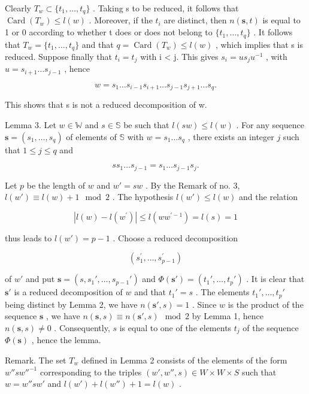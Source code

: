 Clearly \(T_{w} \subset \{t_{1}, \ldots, t_{q}\}\) . Taking s to be reduced, it follows that \(\operatorname{Card}(T_{w}) \leqslant l(w)\) . Moreover, if the \(t_{i}\) are distinct, then \(n(\mathbf{s}, t)\) is equal to 1 or 0 according to whether t does or does not belong to \(\{t_{1}, \ldots, t_{q}\}\) . It follows that \(T_{w} = \{t_{1}, \ldots, t_{q}\}\) and that \(q = \operatorname{Card}(T_{w}) \leqslant l(w)\) , which implies that s is reduced. Suppose finally that \(t_{i} = t_{j}\) with i \textless{} j. This gives \(s_{i} = us_{j}u^{-1}\) , with \(u = s_{i+1} \ldots s_{j-1}\) , hence

\[
w = s _ {1} \dots s _ {i - 1} s _ {i + 1} \dots s _ {j - 1} s _ {j + 1} \dots s _ {q}.
\]

This shows that s is not a reduced decomposition of w.

Lemma 3. Let \(w \in \mathbb{W}\) and \(s \in \mathbb{S}\) be such that \(l(sw) \leqslant l(w)\) . For any sequence \(\mathbf{s} = (s_1, \ldots, s_q)\) of elements of \(\mathbb{S}\) with \(w = s_1 \ldots s_q\) , there exists an integer \(j\) such that \(1 \leqslant j \leqslant q\) and

\[
s s _ {1} \dots s _ {j - 1} = s _ {1} \dots s _ {j - 1} s _ {j}.
\]

Let \(p\) be the length of \(w\) and \(w' = sw\) . By the Remark of no. 3, \(l(w') \equiv l(w) + 1 \mod 2\) . The hypothesis \(l(w') \leqslant l(w)\) and the relation

\[
| l (w) - l (w ^ {\prime}) | \leqslant l (w w ^ {\prime - 1}) = l (s) = 1
\]

thus leads to \(l(w') = p - 1\) . Choose a reduced decomposition

\[
\left(s _ {1} ^ {\prime}, \ldots , s _ {p - 1} ^ {\prime}\right)
\]

of \(w'\) and put \(\mathbf{s} = (s, s_1', \ldots, s_{p-1}')\) and \(\Phi(\mathbf{s}') = (t_1', \ldots, t_p')\) . It is clear that \(\mathbf{s}'\) is a reduced decomposition of \(w\) and that \(t_1' = s\) . The elements \(t_1', \ldots, t_p'\) being distinct by Lemma 2, we have \(n(\mathbf{s}', s) = 1\) . Since \(w\) is the product of the sequence \(\mathbf{s}\) , we have \(n(\mathbf{s}, s) \equiv n(\mathbf{s}', s) \mod 2\) by Lemma 1, hence \(n(\mathbf{s}, s) \neq 0\) . Consequently, \(s\) is equal to one of the elements \(t_j\) of the sequence \(\Phi(\mathbf{s})\) , hence the lemma.

Remark. The set \(T_{w}\) defined in Lemma 2 consists of the elements of the form \(w''sw''^{-1}\) corresponding to the triples \((w', w'', s) \in W \times W \times S\) such that \(w = w''sw'\) and \(l(w') + l(w'') + 1 = l(w)\) .

